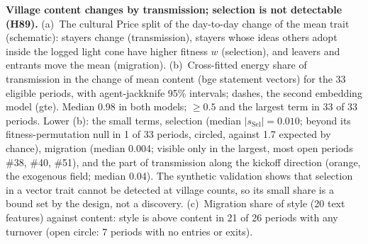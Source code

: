 \caption{\textbf{Village content changes by transmission; selection is not detectable (H89).}
(a)~The cultural Price split of the day-to-day change of the mean trait (schematic): stayers change (transmission), stayers whose ideas others adopt inside the logged light cone have higher fitness $w$ (selection), and leavers and entrants move the mean (migration).
(b)~Cross-fitted energy share of transmission in the change of mean content (bge statement vectors) for the 33 eligible periods, with agent-jackknife 95\% intervals; dashes, the second embedding model (gte). Median 0.98 in both models; $\ge0.5$ and the largest term in 33 of 33 periods.
Lower (b): the small terms, selection (median $|s_\mathrm{Sel}|=0.010$; beyond its fitness-permutation null in 1 of 33 periods, circled, against 1.7 expected by chance), migration (median 0.004; visible only in the largest, most open periods \#38, \#40, \#51), and the part of transmission along the kickoff direction (orange, the exogenous field; median 0.04). The synthetic validation shows that selection in a vector trait cannot be detected at village counts, so its small share is a bound set by the design, not a discovery.
(c)~Migration share of style (20 text features) against content: style is above content in 21 of 26 periods with any turnover (open circle: 7 periods with no entries or exits).}
\label{fig:H89}
